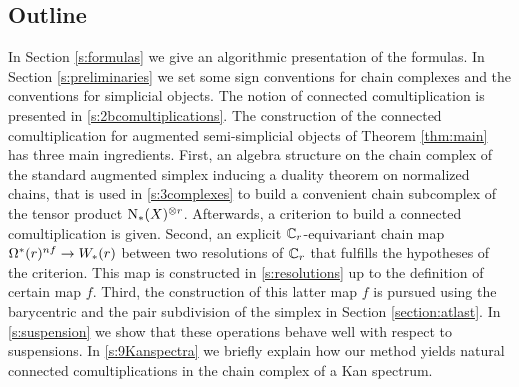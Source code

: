 \subsection{Outline} In Section \ref{s:formulas} we give an algorithmic presentation of the formulas. In Section \ref{s:preliminaries} we set some sign conventions for chain complexes and the conventions for simplicial objects. The notion of connected comultiplication is presented in \cref{s:2bcomultiplications}. The construction of the connected comultiplication for augmented semi-simplicial objects of Theorem \ref{thm:main} has three main ingredients.
First, an algebra structure on the chain complex of the standard augmented simplex inducing a duality theorem on normalized chains, that is used in \cref{s:3complexes} to build a convenient chain subcomplex of the tensor product $\operatorname{N}_{*}(X)^{\otimes r}$. Afterwards, a criterion to build a connected comultiplication is given.
Second, an explicit $\mathbb{C}_r$-equivariant chain map $\Omega^*(r)^{nf}\to W_*(r)$ between two resolutions of $\mathbb{C}_r$ that fulfills the hypotheses of the criterion. This map is constructed in \cref{s:resolutions} up to the definition of certain map $f$. Third, the construction of this latter map $f$ is pursued using the barycentric and the pair subdivision of the simplex in Section \ref{section:atlast}. In \cref{s:suspension} we show that these operations behave well with respect to suspensions. In \cref{s:9Kanspectra} we briefly explain how our method yields natural connected comultiplications in the chain complex of a Kan spectrum.